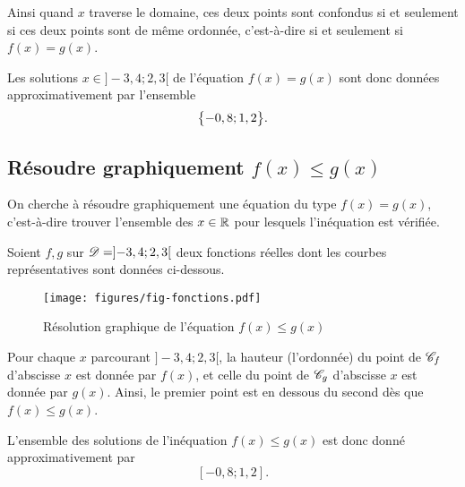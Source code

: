 Ainsi quand $x$ traverse le domaine, ces deux points sont confondus si et seulement si ces deux points sont de même ordonnée, c'est-à-dire si et seulement si $f(x) = g(x)$.		
	
Les solutions $x\in]{-}3,4 ; 2,3[$ de l'équation $f(x) = g(x)$ sont donc données approximativement par l'ensemble
	\[ \bigl\{  -0,8 ; 1,2  \bigr\}. \]



\newpage
\subsection*{Résoudre graphiquement $f(x) \leq g(x)$}

On cherche à résoudre graphiquement une équation du type $f(x)=g(x)$, c'est-à-dire trouver l'ensemble des $x\in\mathbb{R}$ pour lesquels l'inéquation est vérifiée.

Soient $f, g$ sur $\mathcal{D} = ]{-}3,4 ; 2,3[$ deux fonctions réelles dont les courbes représentatives sont données ci-dessous.

\begin{figure}[h]
	\begin{center}
	\texttt{[image: figures/fig-fonctions.pdf]}
	\end{center}
	\caption{Résolution graphique de l'équation $f(x) \leq g(x)$}
\end{figure}

Pour chaque $x$ parcourant $]{-}3,4 ; 2,3[$, la hauteur (l'ordonnée) du point de $\mathcal{C}_f$ d'abscisse $x$ est donnée par $f(x)$, et celle du point de $\mathcal{C}_g$ d'abscisse $x$ est donnée par $g(x)$.
Ainsi, le premier point est en dessous du second dès que $f(x) \leq g(x)$.

L'ensemble des solutions de l'inéquation $f(x) \leq g(x)$ est donc donné approximativement par
	\[ [{-}0,8 ; 1,2 ]. \]


